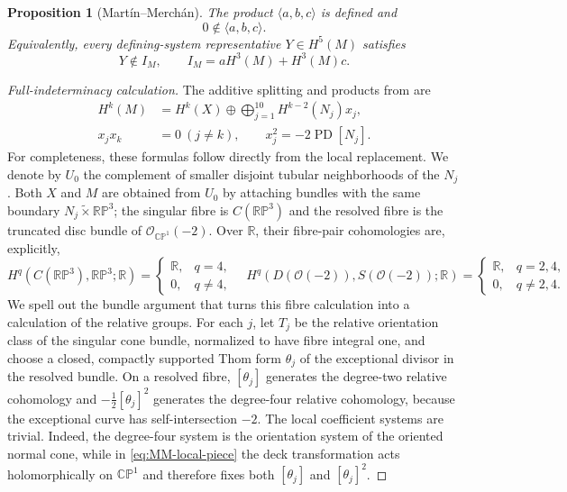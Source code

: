 \documentclass[11pt]{article}
\newtheorem{proposition}[theorem]{Proposition}
\theoremstyle{remark}\newtheorem{remark}[theorem]{Remark}
\newcommand{\R}{\mathbb R}
\newcommand{\RP}{\mathbb {RP}}
\newcommand{\CP}{\mathbb {CP}}
\newcommand{\PD}{\operatorname{PD}}
\begin{document}
\begin{proposition}[Mart\'in--Merch\'an]\label{prop:MM-Massey}
The product $\langle a,b,c\rangle$ is defined and
\begin{equation}\label{eq:MM-nonzero}0\notin\langle a,b,c\rangle.\end{equation}
Equivalently, every defining-system representative $Y\in H^5(M)$ satisfies
\begin{equation}\label{eq:old-indeterminacy}
Y\notin I_M,\qquad I_M=aH^3(M)+H^3(M)c.
\end{equation}
\end{proposition}
\begin{proof}[Full-indeterminacy calculation]
The additive splitting and products from \cite[Section 3]{MM} are
\begin{align}
H^k(M)&=H^k(X)\oplus\bigoplus_{j=1}^{10}H^{k-2}(N_j)x_j,\label{eq:MM-cohom}\\
x_jx_k&=0\ (j\ne k),\qquad x_j^2=-2\PD[N_j].\label{eq:exceptional-products}
\end{align}
For completeness, these formulas follow directly from the local
replacement.  We denote by $U_0$ the complement of smaller disjoint tubular
neighborhoods of the $N_j$.  Both $X$ and $M$ are obtained from $U_0$ by
attaching bundles with the same boundary $N_j\widetilde\times\RP^3$; the
singular fibre is $C(\RP^3)$ and the resolved fibre is the truncated disc
bundle of $\mathcal O_{\CP^1}(-2)$.  Over $\R$, their fibre-pair
cohomologies are, explicitly,
\[
H^q(C(\RP^3),\RP^3;\R)=
 \begin{cases}\R,&q=4,\\0,&q\ne4,\end{cases}
\quad
H^q(D(\mathcal O(-2)),S(\mathcal O(-2));\R)=
 \begin{cases}\R,&q=2,4,\\0,&q\ne2,4.\end{cases}
\]
We spell out the bundle argument that turns this fibre calculation into a
calculation of the relative groups.  For each $j$, let $T_j$ be the relative
orientation class of the singular cone bundle, normalized to have fibre
integral one, and choose a closed, compactly supported Thom form $\theta_j$
of the exceptional divisor in the resolved bundle.  On a resolved fibre,
$[\theta_j]$ generates the degree-two relative cohomology and
$-\frac12[\theta_j]^2$ generates the degree-four relative cohomology,
because the exceptional curve has self-intersection $-2$.  The local
coefficient systems are trivial.  Indeed, the degree-four system is the
orientation system of the oriented normal cone, while in
\eqref{eq:MM-local-piece} the deck transformation acts holomorphically on
$\CP^1$ and therefore fixes both $[\theta_j]$ and
$[\theta_j]^2$.


\end{proof}
\end{document}
